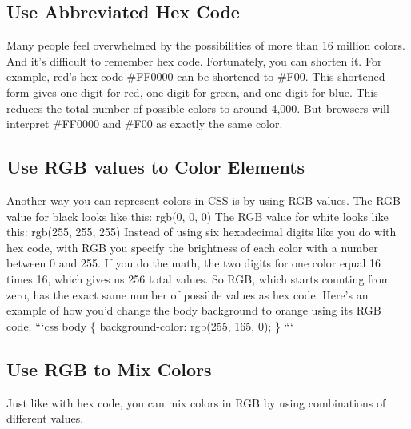 \documentclass{article}%
\begin{document}
%
\subsection{Use Abbreviated Hex Code}%
\label{subsec:UseAbbreviatedHexCode}%
Many people feel overwhelmed by the possibilities of more than 16 million colors. And it's difficult to remember hex code. Fortunately, you can shorten it.\newline%
For example, red's hex code \#FF0000 can be shortened to \#F00. This shortened form gives one digit for red, one digit for green, and one digit for blue.\newline%
This reduces the total number of possible colors to around 4,000. But browsers will interpret \#FF0000 and \#F00 as exactly the same color.\newline%

%
\subsection{Use RGB values to Color Elements}%
\label{subsec:UseRGBvaluestoColorElements}%
Another way you can represent colors in CSS is by using RGB values.\newline%
The RGB value for black looks like this:\newline%
rgb(0, 0, 0)\newline%
The RGB value for white looks like this:\newline%
rgb(255, 255, 255)\newline%
Instead of using six hexadecimal digits like you do with hex code, with RGB you specify the brightness of each color with a number between 0 and 255.\newline%
If you do the math, the two digits for one color equal 16 times 16, which gives us 256 total values. So RGB, which starts counting from zero, has the exact same number of possible values as hex code.\newline%
Here's an example of how you'd change the body background to orange using its RGB code.\newline%
```css\newline%
body \{\newline%
  background{-}color: rgb(255, 165, 0);\newline%
\}\newline%
```\newline%

%
\subsection{Use RGB to Mix Colors}%
\label{subsec:UseRGBtoMixColors}%
Just like with hex code, you can mix colors in RGB by using combinations of different values.\newline%
\end{document}
